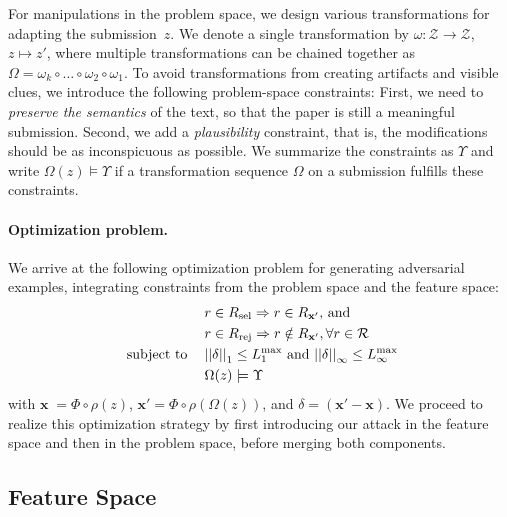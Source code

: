 \documentclass[letterpaper,twocolumn,10pt]{article}
\newcommand{\bow}{\textbf{x}}
\newcommand{\submission}{\bow}
\newcommand{\reviewersset}{\mathcal{R}}
\newcommand{\reviewersubset}{R}
\newcommand{\reviewer}{r}
\newcommand{\select}{\text{sel}}
\newcommand{\reject}{\text{rej}}
\newcommand{\requestedreviewers}{\reviewersubset_{\select}}
\newcommand{\rejectedreviewers}{\reviewersubset_{\reject}}
\newcommand{\extractor}{\Phi}
\newcommand{\modifications}{\delta}
\newcommand{\modificationsmannorm}{{\left| \left| \modifications \right| \right|}_1}
\newcommand{\modificationsinfnorm}{{\left| \left| \modifications \right| \right|}_\infty}
\newcommand{\maxmannorm}{L_1^\text{max}}
\newcommand{\maxinfnorm}{L_\infty^\text{max}}
\newcommand{\Dom}{\ensuremath{\mathcal{Z}}\xspace}
\newcommand{\preprocessing}{\ensuremath{\rho}\xspace}
\newcommand{\inputpdf}{\ensuremath{z}\xspace}
\newcommand{\transformation}{\ensuremath{\omega}\xspace}
\newcommand{\transformations}{\ensuremath{\Omega}\xspace} \begin{acronym}
\begin{document}
For manipulations in the problem space, we design various transformations for adapting the submission~\inputpdf. We denote a single transformation by $\transformation : \Dom \longrightarrow \Dom$,$\;$ $\inputpdf \mapsto \inputpdf'$, where multiple transformations can be chained together as $\transformations = \transformation_k \circ \dots \circ \transformation_2 \circ \transformation_1$. To avoid transformations from creating artifacts and visible clues, we introduce the following problem-space constraints:
First, we need to \emph{preserve the semantics} of the text, so that the paper is still a meaningful submission. Second, we add a \emph{plausibility} constraint, that is, the modifications should be as {inconspicuous\EndAccSupp{}} as possible. 
We summarize the constraints as $\Upsilon$ and write \mbox{$\transformations(\inputpdf) \models \Upsilon$} if a transformation sequence \transformations on a submission fulfills these constraints.

\paragraph{Optimization problem.}
We arrive at the following optimization problem for generating adversarial examples, integrating constraints from the problem space and the feature space:
\begin{equation}
\label{eq:attack-goal}
\begin{split}
  & r \in \requestedreviewers \Rightarrow r \in \reviewersubset_{\submission'} \text{, and} \\ 
  &  r \in \rejectedreviewers \Rightarrow r \notin \reviewersubset_{\submission'}, \forall \reviewer \in \reviewersset\\
\text{ subject to \;\; } & 
\modificationsmannorm \leq \maxmannorm \text{ and }
 \modificationsinfnorm \leq \maxinfnorm \\
& \transformations(\inputpdf) \models \Upsilon 
\end{split}
\end{equation}
with \mbox{$\submission \; = \extractor \circ \preprocessing (\inputpdf)$}, \mbox{$\submission' = \extractor \circ \preprocessing (\transformations(\inputpdf))$}, and \mbox{$\modifications = (\submission' - \submission)$}.
We proceed to realize this optimization strategy by first introducing our attack in the feature space and then in the problem space, before merging both components.

\subsection{Feature Space}
\label{sec:feature-space}
\end{document}
